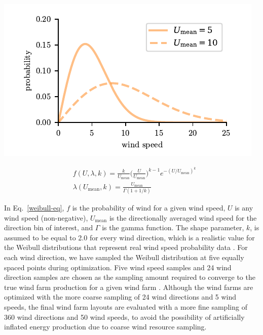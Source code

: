 \documentclass[wes, manuscript]{copernicus}
\begin{document}
	\begin{minipage}{0.5\textwidth}
            \includegraphics{paper-figures/weibullR1}
            
        \end{minipage}
        \begin{minipage}{0.5\textwidth}
            \begin{equation}
            \begin{aligned}
                & f(U,\lambda,k) = \frac{k}{U_\text{mean}}\Big(\frac{U}{U_\text{mean}}\Big)^{k-1}e^{-(U/U_\text{mean})^k}
                \\
             	& \lambda(U_\text{mean},k) = \frac{U_\text{mean}}{\Gamma(1+1/k)}
			\end{aligned}
            \label{weibull-eq}
            \end{equation}
        \end{minipage}\quad
        		
        \bigskip
\noindent In Eq.~\ref{weibull-eq}, $f$ is the probability of wind for a given wind speed, $U$ is any wind speed (non-negative), $U_\text{mean}$ is the directionally averaged wind speed for the direction bin of interest, and $\Gamma$ is the gamma function. The shape parameter, $k$, is assumed to be equal to 2.0 for every wind direction, which is a realistic value for the Weibull distributions that represent real wind speed probability data \citep{rehman1994weibull,seguro2000modern}.
%
For each wind direction, we have sampled the Weibull distribution at five equally spaced points during optimization. Five wind speed samples and 24 wind direction samples are chosen as the sampling amount required to converge to the true wind farm production for a given wind farm \citep{Stanley2018a}. Although the wind farms are optimized with the more coarse sampling of 24 wind directions and 5 wind speeds, the final wind farm layouts are evaluated with a more fine sampling of 360 wind directions and 50 wind speeds, to avoid the possibility of artificially inflated energy production due to coarse wind resource sampling.
\end{document}
